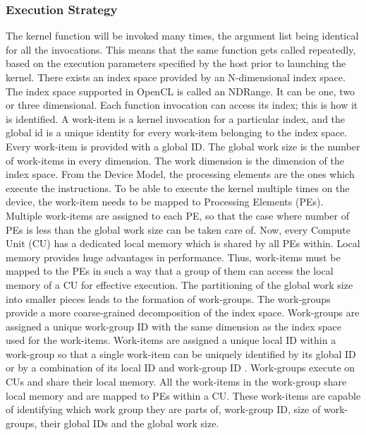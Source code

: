 \subsubsection{Execution Strategy}
The kernel function will be invoked many times, the argument list being identical for all the invocations. This means that the same function gets called repeatedly, based on the execution parameters specified by the host prior to launching the kernel.\newline\newline
There exists an index space provided by an N-dimensional index space. The index space supported in OpenCL is called an NDRange. It can be one, two or three dimensional. Each function invocation can access its index; this is how it is identified. A work-item is a kernel invocation for a particular index, and the global id is a unique identity for every work-item belonging to the index space. Every work-item is provided with a global ID. The global work size is the number of work-items in every dimension. The work dimension is the dimension of the index space.\newline\newline 
From the Device Model, the processing elements are the ones which execute the instructions. To be able to execute the kernel multiple times on the device, the work-item needs to be mapped to Processing Elements (PEs). Multiple work-items are assigned to each PE, so that the case where number of PEs is less than the global work size can be taken care of. \newline\newline
Now, every Compute Unit (CU) has a dedicated local memory which is shared by all PEs within. Local memory provides huge advantages in performance. Thus, work-items must be mapped to the PEs in such a way that a group of them can access the local memory of a CU for effective execution. The partitioning of the global work size into smaller pieces leads to the formation of work-groups. The work-groups provide a more coarse-grained decomposition of the index space. Work-groups are assigned a unique work-group ID with the same dimension as the index space used for the work-items. Work-items are assigned a unique local ID within a work-group so that a single work-item can be uniquely identified by its global ID or by a combination of its local ID and work-group ID \cite{opencl_khronos}. \newline\newline
Work-groups execute on CUs and share their local memory. All the work-items in the work-group share local memory and are mapped to PEs within a CU. These work-items are capable of identifying which work group they are parts of, work-group ID, size of work-groups, their global IDs and the global work size. \newline\newline 
